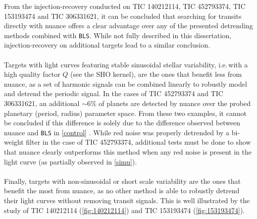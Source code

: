 \documentclass{aastex631}
\begin{document}
From the injection-recovery conducted on TIC 140212114, TIC 452793374, TIC 153193474 and TIC 306331621, it can be concluded that searching for transits directly with \textsf{nuance} offers a clear advantage over any of the presented detrending methods combined with \texttt{BLS}. While not fully described in this dissertation, injection-recovery on additional targets lead to a similar conclusion.\\\\
Targets with light curves featuring stable sinusoidal stellar variability, i.e.\,with a high quality factor $Q$ (see the SHO kernel), are the ones that benefit less from \textsf{nuance}, as a set of harmonic signals can be combined linearly to robustly model and detrend the periodic signal. In the cases of TIC 452793374 and TIC 306331621, an additional $\sim$6\% of planets are detected by \textsf{nuance} over the probed planetary (period, radius) parameter space. From these two examples, it cannot be concluded if this difference is solely due to the difference observed between \textsf{nuance} and \texttt{BLS} in \autoref{control} . While red noise was properly detrended by a bi-weight filter in the case of TIC 452793374, additional tests must be done to show that \textsf{nuance} clearly outperforms this method when any red noise is present in the light curve (as partially observed in \autoref{simu}).
\\\\
Finally, targets with non-sinusoidal or short scale variability are the ones that benefit the most from \textsf{nuance}, as no other method is able to robustly detrend their light curves  without removing transit signals. This is well illustrated by the study of TIC 140212114 (\autoref{fig:140212114}) and TIC 153193474 (\autoref{fig:153193474}).
\end{document}
